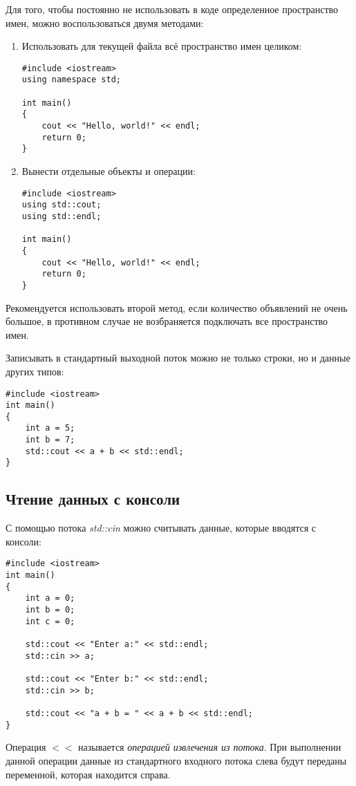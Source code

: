 Для того, чтобы постоянно не использовать в коде определенное пространство имен, можно воспользоваться двумя методами:
\begin{enumerate}
    \item Использовать для текущей файла всё пространство имен целиком:
    \begin{lstlisting}
#include <iostream>
using namespace std;

int main()
{
    cout << "Hello, world!" << endl;
    return 0;
}
    \end{lstlisting}

    \item Вынести отдельные объекты и операции:
    \begin{lstlisting}
#include <iostream>
using std::cout;
using std::endl;

int main()
{
    cout << "Hello, world!" << endl;
    return 0;
}
    \end{lstlisting}
\end{enumerate}

Рекомендуется использовать второй метод, если количество объявлений не очень большое, в противном случае не возбраняется подключать все пространство имен.

Записывать в стандартный выходной поток можно не только строки, но и данные других типов:

\begin{lstlisting}
#include <iostream>
int main()
{
    int a = 5;
    int b = 7;
    std::cout << a + b << std::endl;
}
\end{lstlisting}

\subsection{Чтение данных с консоли}

С помощью потока \textit{std::cin} можно считывать данные, которые вводятся с консоли:
\begin{lstlisting}
#include <iostream>
int main()
{
    int a = 0;
    int b = 0;
    int c = 0;

    std::cout << "Enter a:" << std::endl;
    std::cin >> a;

    std::cout << "Enter b:" << std::endl;
    std::cin >> b;

    std::cout << "a + b = " << a + b << std::endl;
}
\end{lstlisting}

Операция $<<$ называется \textit{операцией извлечения из потока}. При выполнении данной операции данные из стандартного входного потока слева будут переданы переменной, которая находится справа.

